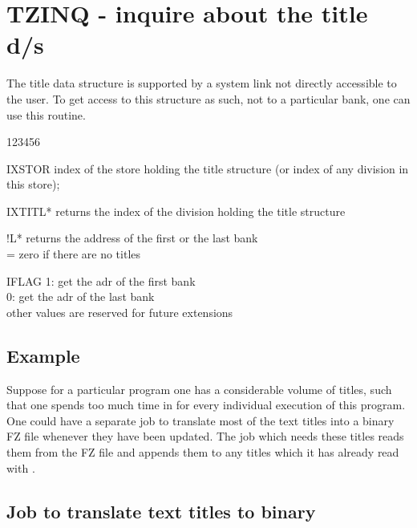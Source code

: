 \section{TZINQ - inquire about the title d/s}

The title data structure is supported by a system link not directly accessible
to the user.
To get access to this structure as such, not to a particular bank,
one can use this routine.


\begin{DLtt}{123456}
\item[IXSTOR]  index of the store holding the title structure
               (or index of any division in this store);
\item[IXTITL*] returns the index of the division holding
               the title structure
\item[!L*]      returns the address of the first or the last bank\\
                = zero if there are no titles
\item[IFLAG] 1: get the adr of the first bank\\
             0: get the adr of the  last bank\\
             other values are reserved for future extensions
\end{DLtt}

\subsection*{Example}

Suppose for a particular program one has a considerable volume of titles,
such that one spends too much time in  for every individual
execution of this program.
One could have a separate job to translate most of the text titles
into a binary FZ file whenever they have been updated.
The job which needs these titles reads them from the FZ file
and appends them to any titles which it has already read with .

\subsection*{Job to translate text titles to binary}

